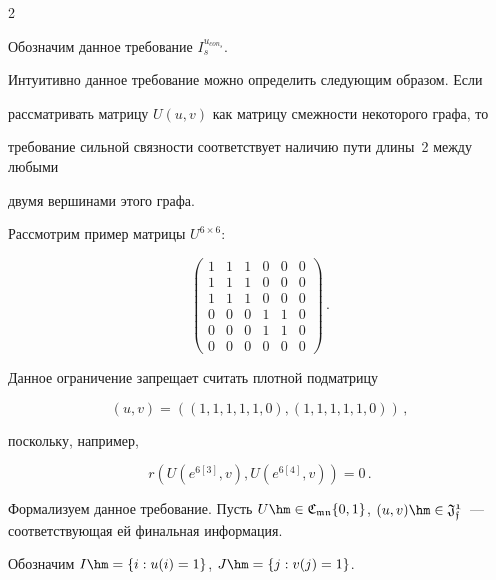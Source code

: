 \begin{multicols}{2}
\begin{description}
Обозначим данное требование $I_s^{u_{con_s}}$.





Интуитивно данное требование можно определить следующим образом. Если 


рассматривать матрицу $U(u,v)$ как матрицу смежности некоторого графа, то 


требование сильной связности соответствует наличию пути длины~2 между любыми 


двумя вершинами этого графа.





Рассмотрим пример матрицы $U^{6\times 6}$:


$$


\begin{pmatrix} 


1 & 1 & 1 & 0 & 0 & 0 \\ 


1 & 1 & 1 & 0 & 0 & 0 \\


 1 & 1 & 1 & 0 & 0 & 0\\


0 & 0 & 0 & 1 & 1 & 0 \\ 


0 & 0 & 0 & 1 & 1 & 0 \\ 


0 & 0 & 0 & 0 & 0 & 


0 \end{pmatrix}\,.


$$





Данное ограничение запрещает считать плотной подматрицу


$$


(u,v)=((1,1,1,1,1,0), (1,1,1,1,1,0))\,,


$$


 поскольку, например,


$$


r\left(U\left(e^{6[3]}, v\right), U\left(e^{6[4]}, v\right)\right) = 0\,.


$$





Формализуем данное требование. Пусть $U \hm\in \mathfrak{C_{mn}}\{0,1\}$, $(u,v) 


\hm\in  \mathfrak{J_f^1}$~--- соответствующая ей финальная информация. 


Обозначим $I \hm= \{i:u(i)=1\}$, $J \hm= \{j:v(j)=1\}$.






\end{description}
\end{multicols}
